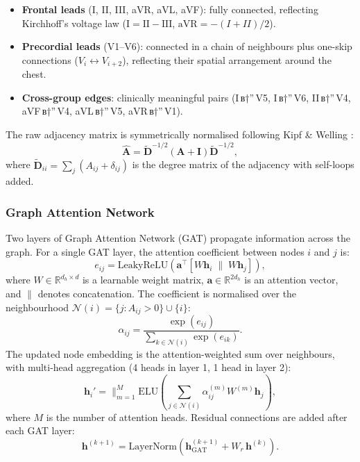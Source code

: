 \begin{itemize}
  \item \textbf{Frontal leads} (I, II, III, aVR, aVL, aVF): fully
        connected, reflecting Kirchhoff's voltage law
        ($\mathrm{I} = \mathrm{II} - \mathrm{III}$,
        $\mathrm{aVR} = -(I + II)/2$).
  \item \textbf{Precordial leads} (V1--V6): connected in a chain of
        neighbours plus one-skip connections
        ($V_i \leftrightarrow V_{i+2}$), reflecting their
        spatial arrangement around the chest.
  \item \textbf{Cross-group edges}: clinically meaningful pairs
        (I\,в†”\,V5, I\,в†”\,V6, II\,в†”\,V4, aVF\,в†”\,V4,
        aVL\,в†”\,V5, aVR\,в†”\,V1).
\end{itemize}

The raw adjacency matrix is symmetrically normalised following
Kipf \& Welling \cite{ref20}:
\begin{equation}
  \hat{\mathbf{A}} = \tilde{\mathbf{D}}^{-1/2}
    (\mathbf{A} + \mathbf{I})
    \tilde{\mathbf{D}}^{-1/2},
  \label{eq:gcn_norm}
\end{equation}
where $\tilde{\mathbf{D}}_{ii} = \sum_j (A_{ij} + \delta_{ij})$ is the
degree matrix of the adjacency with self-loops added.

\subsubsection{Graph Attention Network}

Two layers of Graph Attention Network (GAT) \cite{ref24} propagate
information across the graph.
For a single GAT layer, the attention coefficient between nodes $i$ and
$j$ is:
\begin{equation}
  e_{ij} = \mathrm{LeakyReLU}\!\left(
    \mathbf{a}^\top
    \left[ W\mathbf{h}_i \;\|\; W\mathbf{h}_j \right]
  \right),
  \label{eq:gat_energy}
\end{equation}
where $W \in \mathbb{R}^{d_h \times d}$ is a learnable weight matrix,
$\mathbf{a} \in \mathbb{R}^{2d_h}$ is an attention vector, and
$\|$ denotes concatenation.
The coefficient is normalised over the neighbourhood
$\mathcal{N}(i) = \{j : A_{ij} > 0\} \cup \{i\}$:
\begin{equation}
  \alpha_{ij} = \frac{\exp(e_{ij})}{\sum_{k \in \mathcal{N}(i)}\exp(e_{ik})}.
  \label{eq:gat_softmax}
\end{equation}
The updated node embedding is the attention-weighted sum over neighbours,
with multi-head aggregation (4 heads in layer 1, 1 head in layer 2):
\begin{equation}
  \mathbf{h}_i' = \Big\|_{m=1}^{M}
    \mathrm{ELU}\!\left(
      \sum_{j \in \mathcal{N}(i)} \alpha_{ij}^{(m)} W^{(m)} \mathbf{h}_j
    \right),
  \label{eq:gat_update}
\end{equation}
where $M$ is the number of attention heads.
Residual connections are added after each GAT layer:
\begin{equation}
  \mathbf{h}^{(k+1)} = \mathrm{LayerNorm}\!\left(
    \mathbf{h}^{(k+1)}_\mathrm{GAT} + W_r\, \mathbf{h}^{(k)}
  \right).
  \label{eq:gat_residual}
\end{equation}

